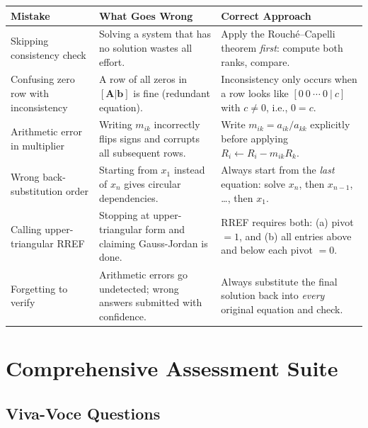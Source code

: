 \documentclass[12pt,a4paper]{article}
\begin{document}
\begin{mistakebox}
\begin{tabular}{@{}p{4cm}p{5cm}p{5cm}@{}}
\toprule
\textbf{Mistake} & \textbf{What Goes Wrong} & \textbf{Correct Approach} \\
\midrule
Skipping consistency check & Solving a system that has no solution wastes all effort. &
  Apply the Rouch\'{e}--Capelli theorem \textit{first}: compute both ranks, compare. \\
\addlinespace
Confusing zero row with inconsistency & A row of all zeros in $[\mathbf{A}|\mathbf{b}]$ is fine
  (redundant equation). &
  Inconsistency only occurs when a row looks like $[0\ 0\ \cdots\ 0\ |\ c]$ with $c \neq 0$,
  i.e., $0 = c$. \\
\addlinespace
Arithmetic error in multiplier & Writing $m_{ik}$ incorrectly flips signs and corrupts all subsequent rows. &
  Write $m_{ik} = a_{ik}/a_{kk}$ explicitly before applying $R_i \leftarrow R_i - m_{ik}R_k$. \\
\addlinespace
Wrong back-substitution order & Starting from $x_1$ instead of $x_n$ gives circular dependencies. &
  Always start from the \textit{last} equation: solve $x_n$, then $x_{n-1}$, \ldots, then $x_1$. \\
\addlinespace
Calling upper-triangular RREF & Stopping at upper-triangular form and claiming Gauss-Jordan is done. &
  RREF requires both: (a) pivot $= 1$, and (b) all entries above and below each pivot $= 0$. \\
\addlinespace
Forgetting to verify & Arithmetic errors go undetected; wrong answers submitted with confidence. &
  Always substitute the final solution back into \textit{every} original equation and check. \\
\bottomrule
\end{tabular}
\end{mistakebox}

\section{Comprehensive Assessment Suite}

\subsection*{Viva-Voce Questions}
\end{document}
